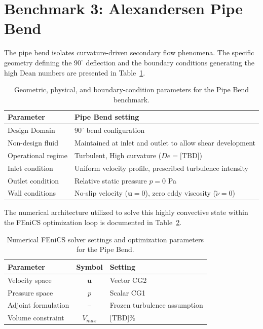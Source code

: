 \section{Benchmark 3: Alexandersen Pipe Bend}
\label{app:config_pipebend}

The pipe bend isolates curvature-driven secondary flow phenomena. The specific geometry defining the $90^\circ$ deflection and the boundary conditions generating the high Dean numbers are presented in Table~\ref{tab:app_pipebend_physical}.

\begin{table}[htbp]
	\centering
	\footnotesize
	\caption{Geometric, physical, and boundary-condition parameters for the Pipe Bend benchmark.}
	\label{tab:app_pipebend_physical}
	\renewcommand{\arraystretch}{1.2}
	\begin{tabularx}{\textwidth}{l X}
		\hline
		\textbf{Parameter} & \textbf{Pipe Bend setting} \\
		\hline
		Design Domain & $90^\circ$ bend configuration \\
		Non-design fluid & Maintained at inlet and outlet to allow shear development \\
		Operational regime & Turbulent, High curvature ($De = \text{[TBD]}$) \\
		Inlet condition & Uniform velocity profile, prescribed turbulence intensity \\
		Outlet condition & Relative static pressure $p = 0$ Pa \\
		Wall conditions & No-slip velocity ($\mathbf{u} = 0$), zero eddy viscosity ($\tilde{\nu} = 0$) \\
		\hline
	\end{tabularx}
\end{table}

The numerical architecture utilized to solve this highly convective state within the FEniCS optimization loop is documented in Table~\ref{tab:app_pipebend_numerical}.

\begin{table}[htbp]
	\centering
	\footnotesize
	\caption{Numerical FEniCS solver settings and optimization parameters for the Pipe Bend.}
	\label{tab:app_pipebend_numerical}
	\renewcommand{\arraystretch}{1.2}
	\begin{tabularx}{\textwidth}{l c X}
		\hline
		\textbf{Parameter} & \textbf{Symbol} & \textbf{Setting} \\
		\hline
		Velocity space & $\mathbf{u}$ & Vector CG2 \\
		Pressure space & $p$ & Scalar CG1 \\
		Adjoint formulation & -- & Frozen turbulence assumption \\
		Volume constraint & $V_{max}$ & [TBD]\% \\
		\hline
	\end{tabularx}
\end{table}

